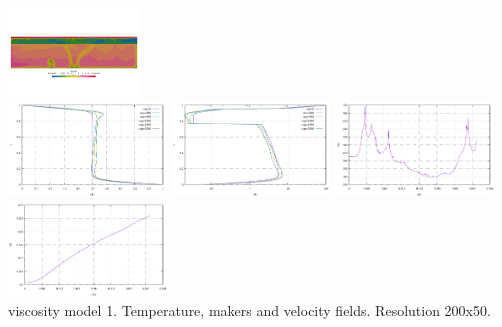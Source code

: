 \begin{center}
\includegraphics[width=3.5cm]{python_codes/fieldstone_88/results/model3/v0019.png}\\
\includegraphics[width=4.2cm]{python_codes/fieldstone_88/results/model3/profile_T.pdf}
\includegraphics[width=4.2cm]{python_codes/fieldstone_88/results/model3/profile_eta.pdf}
\includegraphics[width=4.2cm]{python_codes/fieldstone_88/results/model3/vrms.pdf}
\includegraphics[width=4.2cm]{python_codes/fieldstone_88/results/model3/Tavrg.pdf}\\
{\captionfont viscosity model 1. Temperature, makers and velocity fields. Resolution 200x50.}
\end{center} 


